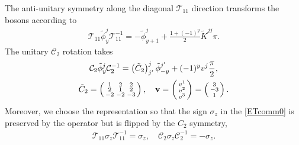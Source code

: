 The anti-unitary \AFTR symmetry along the diagonal $\mathcal{T}_{11}$ direction transforms the bosons according to \begin{align}\mathcal{T}_{11}\tilde\phi^j_y\mathcal{T}_{11}^{-1}=-\tilde\phi^j_{y+1}+\frac{1+(-1)^y}{2}\tilde{K}^{jj}\pi.\label{bosonTR11}\end{align} The unitary $\mathcal{C}_2$ rotation takes \begin{gather}\mathcal{C}_2\tilde\phi^j_y\mathcal{C}_2^{-1}=\left(\tilde{C}_2\right)^j_{j'}\tilde\phi^{j'}_{-y}+(-1)^yv^j\frac{\pi}{2},\label{bosonC2}\\\tilde{C}_2=\left(\begin{smallmatrix}1&2&2\\2&1&2\\-2&-2&-3\end{smallmatrix}\right),\quad{\bf v}=\left(\begin{smallmatrix}v^1\\v^2\\v^3\end{smallmatrix}\right)=\left(\begin{smallmatrix}3\\-3\\1\end{smallmatrix}\right).\nonumber\end{gather} Moreover, we choose the representation so that the sign $\sigma_z$ in the \ETCR \eqref{ETcomm0} is preserved by the \AFTR operator but is flipped by the $C_2$ symmetry, \begin{align}\mathcal{T}_{11}\sigma_z\mathcal{T}_{11}^{-1}=\sigma_z,\quad\mathcal{C}_2\sigma_z\mathcal{C}_2^{-1}=-\sigma_z.\end{align} 

